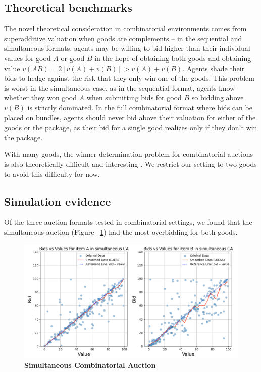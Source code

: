 \documentclass{article} %
\begin{document}
\subsection{Theoretical benchmarks}
The novel theoretical consideration in combinatorial environments comes from superadditive valuation when goods are complements -- in the sequential and simultaneous formats, agents may be willing to bid higher than their individual values for good $A$ or good $B$ in the hope of obtaining both goods and obtaining value $v(AB) = 2[v(A) + v(B)] > v(A)+v(B)$. 
Agents shade their bids to hedge against the risk that they only win one of the goods. 
This problem is worst in the simultaneous case, as in the sequential format, agents know whether they won good $A$ when submitting bids for good $B$ so bidding above $v(B)$ is strictly dominated. 
In the full combinatorial format where bids can be placed on bundles, agents should never bid above their valuation for either of the goods or the package, as their bid for a single good realizes only if they don't win the package.

With many goods, the winner determination problem for combinatorial auctions is also theoretically difficult and interesting \cite{lehmann2006winner}. 
We restrict our setting to two goods to avoid this difficulty for now.

\subsection{Simulation evidence}
Of the three auction formats tested in combinatorial settings, we found that the simultaneous auction (Figure ~\ref{fig:simu}) had the most overbidding for both goods. 

\begin{figure}[h!]
    \centering \includegraphics[width=\linewidth]{Figs/Simultaneous.png}
    \caption{\textbf{Simultaneous Combinatorial Auction} }
    \label{fig:simu}
\end{figure}
\end{document}
